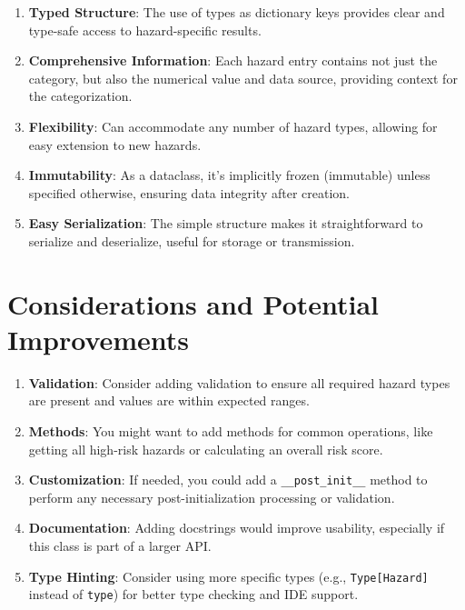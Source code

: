 \documentclass{article}
\begin{document}
\begin{enumerate}
    \item \textbf{Typed Structure}: The use of types as dictionary keys provides clear and type-safe access to hazard-specific results.

    \item \textbf{Comprehensive Information}: Each hazard entry contains not just the category, but also the numerical value and data source, providing context for the categorization.

    \item \textbf{Flexibility}: Can accommodate any number of hazard types, allowing for easy extension to new hazards.

    \item \textbf{Immutability}: As a dataclass, it's implicitly frozen (immutable) unless specified otherwise, ensuring data integrity after creation.

    \item \textbf{Easy Serialization}: The simple structure makes it straightforward to serialize and deserialize, useful for storage or transmission.
\end{enumerate}

\section{Considerations and Potential Improvements}

\begin{enumerate}
    \item \textbf{Validation}: Consider adding validation to ensure all required hazard types are present and values are within expected ranges.

    \item \textbf{Methods}: You might want to add methods for common operations, like getting all high-risk hazards or calculating an overall risk score.

    \item \textbf{Customization}: If needed, you could add a \texttt{\_\_post\_init\_\_} method to perform any necessary post-initialization processing or validation.

    \item \textbf{Documentation}: Adding docstrings would improve usability, especially if this class is part of a larger API.

    \item \textbf{Type Hinting}: Consider using more specific types (e.g., \texttt{Type[Hazard]} instead of \texttt{type}) for better type checking and IDE support.
\end{enumerate}
\end{document}
